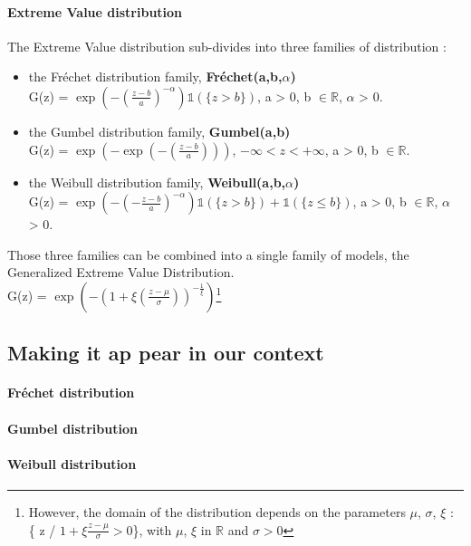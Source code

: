 \paragraph{Extreme Value distribution} The Extreme Value distribution sub-divides into three families of distribution :
\begin{itemize}
	\item the Fréchet distribution family, \textbf{Fréchet(a,b,$\alpha$)} \\
	G(z) = $\exp(-(\frac{z-b}{a})^{-\alpha})\mathbb{1}(\{z > b\})$, a > 0, b $\in \mathbb{R}$, $\alpha$ > 0.
	\item the Gumbel distribution family, \textbf{Gumbel(a,b)} \\ 
	G(z) = $\exp(-\exp(-(\frac{z-b}{a})))$, $-\infty < z < +\infty$, a > 0, b $\in \mathbb{R}$.
	\item the Weibull distribution family, \textbf{Weibull(a,b,$\alpha$)} \\
	G(z) = $\exp(-(-\frac{z-b}{a})^{-\alpha})\mathbb{1}(\{z > b\}) + \mathbb{1}(\{z \le b\})$, a > 0, b $\in \mathbb{R}$, $\alpha$ > 0.
\end{itemize}
\newline
Those three families can be combined into a single family of models, the Generalized Extreme Value Distribution. \\
G(z) = $\exp(-(1 + \xi(\frac{z - \mu}{\sigma}))^{-\frac{1}{\xi}})$\footnote{However, the domain of the distribution depends on the parameters $\mu$, $\sigma$, $\xi$ : \{ z / $1 + \xi\frac{z-\mu}{\sigma} > 0$\}, with $\mu$, $\xi$ in $\mathbb{R}$ and $\sigma > 0$}
\subsection{Making it ap pear in our context}
\paragraph{Fréchet distribution}
\paragraph{Gumbel distribution}
\paragraph{Weibull distribution}


